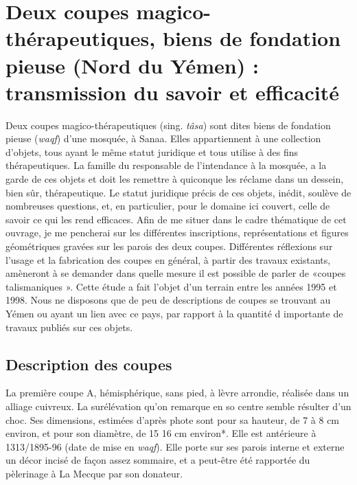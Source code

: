  
\section{Deux coupes magico-thérapeutiques, biens de fondation pieuse (Nord du Yémen) : transmission du savoir et efficacité}
 
Deux coupes magico-thérapeutiques (sing. \textit{tâsa}) sont dites biens de fondation pieuse ({\textit{waqf}}) d'une mosquée, à Sanaa. Elles appartiennent à une collection d'objets, tous ayant le même statut juridique et tous utilise à des fins thérapeutiques. La famille du responsable de l'intendance à la mosquée, a la garde de ces objets et doit les remettre à quiconque les réclame dans un dessein, bien sûr, thérapeutique. Le statut juridique précis de ces objets, inédit, soulève de nombreuses questions, et, en particulier, pour le domaine ici couvert, celle de savoir ce qui les rend efficaces.
Afin de me situer dans le cadre thématique de cet ouvrage, je me pencherai sur les différentes inscriptions, représentations et figures géométriques gravées sur les parois des deux coupes. Différentes réflexions sur l'usage et la fabrication des coupes en général, à partir des travaux existants, amèneront à se demander dans quelle mesure il est possible de parler de «coupes talismaniques ».
Cette étude a fait l'objet d'un terrain entre les années 1995 et 1998.
Nous ne disposons que de peu de descriptions de coupes se trouvant au Yémen ou ayant un lien avec ce pays, par rapport à la quantité d importante de travaux publiés sur ces objets.
\subsection{Description des coupes}


La première coupe A, hémisphérique, sans pied, à lèvre arrondie, réalisée dans un alliage cuivreux. La surélévation qu'on remarque en so centre semble résulter d'un choc. Ses dimensions, estimées d'après phote sont pour sa hauteur, de 7 à 8 cm environ, et pour son diamètre, de 15 16 cm environ*. Elle est antérieure à 1313/1895-96 (date de mise en \textit{waqf}). Elle porte sur ses parois interne et externe un décor incisé de façon assez sommaire, et a peut-être été rapportée du pèlerinage à La Mecque par son donateur.


